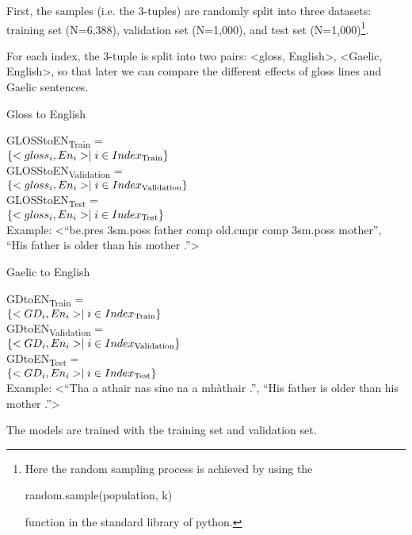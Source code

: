\documentclass[11pt,a4paper]{article}
\begin{document}
First, the samples (i.e. the 3-tuples) are randomly split into three datasets: training set (N=6,388), validation set (N=1,000), and test set (N=1,000)\footnote{Here the random sampling process is achieved by using the \begin{myfont}random.sample(population, k)\end{myfont} function in the standard library of python.}.

For each index, the 3-tuple is split into two pairs: <gloss, English>, <Gaelic, English>, so that later we can compare the different effects of gloss lines and Gaelic sentences. 
\begin{exe}
	\ex Gloss to English
		\begin{xlist}
		\ex \label{GLOSStoENTrain} GLOSStoEN\textsubscript{Train}   =\\$\{<gloss_i,En_i>  \mid i \in Index\textsubscript{Train} \}$ \\
		\ex \label{GLOSStoENVal} GLOSStoEN\textsubscript{Validation}   = \\$\{<gloss_i,En_i>  \mid i \in Index\textsubscript{Validation} \}$ \\
		\ex \label{GLOSStoENTest}GLOSStoEN\textsubscript{Test} = \\$\{<gloss_i,En_i>  \mid i \in Index\textsubscript{Test} \}$ \\
		\ex  Example: <``be.pres 3sm.poss father comp old.cmpr comp 3sm.poss mother'', ``His father is older than his mother .''>
		\end{xlist}

	
	\ex Gaelic to English
		\begin{xlist}
		\ex \label{GDtoENTrain} GDtoEN\textsubscript{Train}   = \\$\{<GD_i,En_i>  \mid i \in Index\textsubscript{Train} \}$ \\
		\ex \label{GDtoENVal} GDtoEN\textsubscript{Validation}   =\\ $\{<GD_i,En_i>  \mid i \in Index\textsubscript{Validation} \}$ \\
		\ex \label{GDtoENTest} GDtoEN\textsubscript{Test}    = \\$\{<GD_i,En_i>  \mid i \in Index\textsubscript{Test} \}$ \\
		\ex Example: <``Tha a athair nas sine na a mh\`athair .'', ``His father is older than his mother .''>
		\end{xlist}
\end{exe}
The models are trained with the training set and validation set. 
\end{document}
